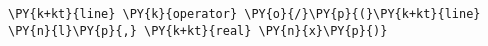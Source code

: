 \begin{Verbatim}[commandchars=\\\{\}]
    \PY{k+kt}{line} \PY{k}{operator} \PY{o}{/}\PY{p}{(}\PY{k+kt}{line} \PY{n}{l}\PY{p}{,} \PY{k+kt}{real} \PY{n}{x}\PY{p}{)}
\end{Verbatim}
